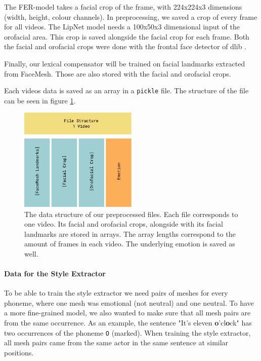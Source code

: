 The FER-model takes a facial crop of the frame, with 224x224x3 dimensions (width, height, colour channels). In preprocessing, we saved a crop of every frame for all videos. 
The LipNet model needs a 100x50x3 dimensional input of the orofacial area. This crop is saved alongside the facial crop for each frame. Both the facial and orofacial crops were done with the frontal face detector of dlib \cite{dlib09}.

Finally, our lexical compensator will be trained on facial landmarks extracted from FaceMesh. Those are also stored with the facial and orofacial crops.

Each videos data is saved as an array in a \texttt{pickle} file. The structure of the file can be seen in figure \ref{fig:pickle}.
\begin{figure}
    \centering
    \includegraphics[width=0.5\textwidth]{res/Pickle.pdf}
    \caption{The data structure of our preprocessed files. Each file corresponds to one video. Its facial and orofacial crops, alongside with its facial landmarks are stored in arrays. The array lengths correspond to the amount of frames in each video. The underlying emotion is saved as well.}
    \label{fig:pickle}
\end{figure}

\paragraph{Data for the Style Extractor}
To be able to train the style extractor we need pairs of meshes for every phoneme, where one mesh was emotional (not neutral) and one neutral. To have a more fine-grained model, we also wanted to make sure that all mesh pairs are from the same occurrence. As an example, the sentence "It's eleven \textbf{o}'cl\textbf{o}ck" has two occurrences of the phoneme \texttt{O} (marked). When training the style extractor, all mesh pairs came from the same actor in the same sentence at similar positions.


